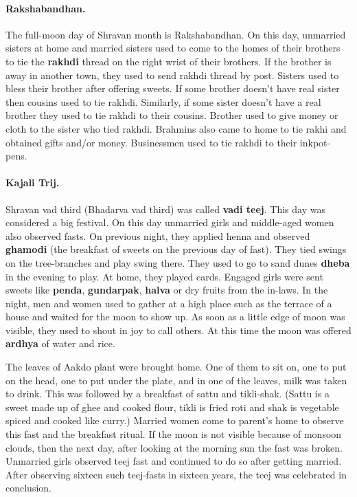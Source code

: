 \paragraph{Rakshabandhan.} The full-moon day of Shravan month is Rakshabandhan.
On this day, unmarried sisters at home and married sisters used to come to the
homes of their brothers to tie the \textbf{rakhdi} thread on the right wrist of
their brothers. If the brother is away in another town, they used to send rakhdi
thread by post. Sisters used to bless their brother after offering sweets. If
some brother doesn't have real sister then cousins used to tie rakhdi. Similarly, if
some sister  doesn't have a real brother they used to tie rakhdi to their
cousins. Brother used to give money or cloth to the sister who tied rakhdi.
Brahmins also came to home to tie rakhi and obtained gifts and/or money.
Businessmen used to tie rakhdi to their inkpot-pens. 
\paragraph{Kajali Trij.} Shravan vad third (Bhadarva vad third) was called
\textbf{vadi teej}. This day was considered a big festival. On this day
unmarried girls and middle-aged women also observed fasts. On previous night,
they applied henna and observed \textbf{ghamodi} (the breakfast of sweets on the
previous day of fast). They tied swings on the tree-branches and play swing
there. They used to go to sand dunes \textbf{dheba} in the evening to play. At
home, they played cards. Engaged girls were sent sweets like \textbf{penda},
\textbf{gundarpak}, \textbf{halva} or dry fruits from the in-laws. In the night,
men and women used to gather at a high place such as the terrace of a house and
waited for the moon to show up. As soon as a little edge of moon was visible,
they used to shout in joy to call others. At this time the moon was offered
\textbf{ardhya} of water and rice.

The leaves of Aakdo plant were brought home. One of them to sit on, one to put
on the head, one to put under the plate, and in one of the leaves, milk was
taken to drink. This was followed by a breakfast of sattu and tikli-shak. (Sattu
is a sweet made up of ghee and cooked flour, tikli is fried roti and shak is
vegetable spiced and cooked like curry.) Married women come to parent's home to
observe this fast and the breakfast ritual. If the moon is not visible because
of monsoon clouds, then the next day, after looking at the morning sun the fast
was broken. Unmarried girls observed teej fast and continued to do so after
getting married. After observing sixteen such teej-fasts in sixteen years, the
teej was celebrated in conclusion.
